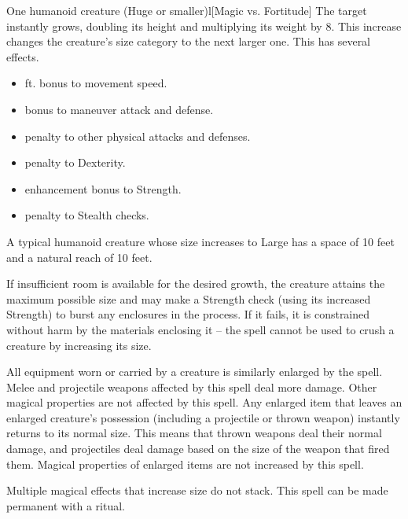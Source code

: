 \spellrng{\rngclose}
\spelldur{\durshort \dismissable}
\begin{spelltarget}{One humanoid creature (Huge or smaller)}l[Magic vs. Fortitude]
    \spelleffect The target instantly grows, doubling its height and multiplying its weight by 8. This increase changes the creature's size category to the next larger one. This has several effects.
    \begin{itemize} 
        \item {} ft. bonus to movement speed.
        \item {} bonus to maneuver attack and defense.
        \item {} penalty to other physical attacks and defenses.
        \item {} penalty to Dexterity.
        \item {} enhancement bonus to Strength.
        \item {} penalty to Stealth checks.
    \end{itemize}
    \par A typical humanoid creature whose size increases to Large has a space of 10 feet and a natural reach of 10 feet.
    \par If insufficient room is available for the desired growth, the creature attains the maximum possible size and may make a Strength check (using its increased Strength) to burst any enclosures in the process. If it fails, it is constrained without harm by the materials enclosing it -- the spell cannot be used to crush a creature by increasing its size.
    \par All equipment worn or carried by a creature is similarly enlarged by the spell. Melee and projectile weapons affected by this spell deal more damage. Other magical properties are not affected by this spell. Any enlarged item that leaves an enlarged creature's possession (including a projectile or thrown weapon) instantly returns to its normal size. This means that thrown weapons deal their normal damage, and projectiles deal damage based on the size of the weapon that fired them. Magical properties of enlarged items are not increased by this spell.
\end{spelltarget}
\spellnotes Multiple magical effects that increase size do not stack. This spell can be made permanent with a  ritual.

